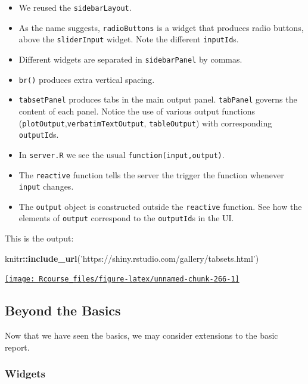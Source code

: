 \documentclass[]{book}
\newenvironment{Shaded}{\begin{snugshade}}{\end{snugshade}}
\newcommand{\KeywordTok}[1]{\textcolor[rgb]{0.13,0.29,0.53}{\textbf{#1}}}
\newcommand{\StringTok}[1]{\textcolor[rgb]{0.31,0.60,0.02}{#1}}
\newcommand{\OperatorTok}[1]{\textcolor[rgb]{0.81,0.36,0.00}{\textbf{#1}}}
\newcommand{\NormalTok}[1]{#1}
\providecommand{\tightlist}{%
  \setlength{\itemsep}{0pt}\setlength{\parskip}{0pt}}
\theoremstyle{definition}
\theoremstyle{definition}
\theoremstyle{definition}
\theoremstyle{remark}
\begin{document}
\begin{itemize}
\tightlist
\item
  We reused the \texttt{sidebarLayout}.
\item
  As the name suggests, \texttt{radioButtons} is a widget that produces
  radio buttons, above the \texttt{sliderInput} widget. Note the
  different \texttt{inputId}s.
\item
  Different widgets are separated in \texttt{sidebarPanel} by commas.
\item
  \texttt{br()} produces extra vertical spacing.
\item
  \texttt{tabsetPanel} produces tabs in the main output panel.
  \texttt{tabPanel} governs the content of each panel. Notice the use of
  various output functions
  (\texttt{plotOutput},\texttt{verbatimTextOutput},
  \texttt{tableOutput}) with corresponding \texttt{outputId}s.
\item
  In \texttt{server.R} we see the usual \texttt{function(input,output)}.
\item
  The \texttt{reactive} function tells the server the trigger the
  function whenever \texttt{input} changes.
\item
  The \texttt{output} object is constructed outside the
  \texttt{reactive} function. See how the elements of \texttt{output}
  correspond to the \texttt{outputId}s in the UI.
\end{itemize}

This is the output:

\begin{Shaded}
\begin{Highlighting}[]
\NormalTok{knitr}\OperatorTok{::}\KeywordTok{include_url}\NormalTok{(}\StringTok{'https://shiny.rstudio.com/gallery/tabsets.html'}\NormalTok{)}
\end{Highlighting}
\end{Shaded}

\href{https://shiny.rstudio.com/gallery/tabsets.html}{\texttt{[image: Rcourse\_files/figure-latex/unnamed-chunk-266-1]} }

\subsection{Beyond the Basics}\label{beyond-the-basics}

Now that we have seen the basics, we may consider extensions to the
basic report.

\subsubsection{Widgets}\label{widgets}
\end{document}
